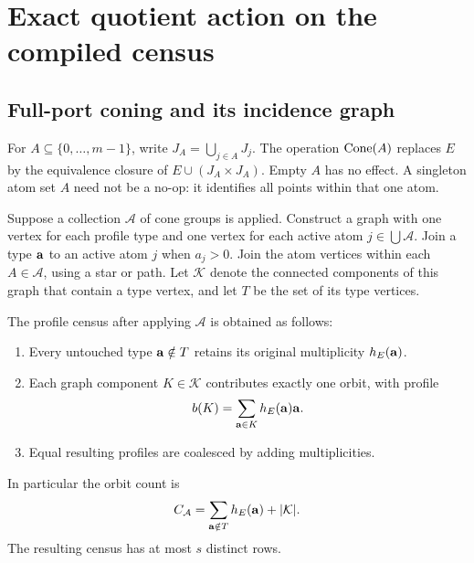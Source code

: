 \section{Exact quotient action on the compiled census}
\label{sec:quotients}

\subsection{Full-port coning and its incidence graph}

For $A\subseteq\{0,\ldots,m-1\}$, write $J_A=\bigcup_{j\in A}J_j$.
The operation $\operatorname{Cone}(A)$ replaces $E$ by the equivalence closure of
$E\cup(J_A\times J_A)$. Empty $A$ has no effect. A singleton atom set $A$
need not be a no-op: it identifies all points within that one atom.

Suppose a collection $\mathcal A$ of cone groups is applied. Construct a
graph with one vertex for each profile type and one vertex for each active
atom $j\in\bigcup\mathcal A$. Join a type $\mathbf a$ to an active atom $j$
when $a_j>0$. Join the atom vertices within each $A\in\mathcal A$, using a
star or path. Let $\mathcal K$ denote the connected components of this graph
that contain a type vertex, and let $T$ be the set of its type vertices.

\begin{theorem}
\label{thm:quotient}
The profile census after applying $\mathcal A$ is obtained as follows:
\begin{enumerate}[label=(\roman*)]
\item Every untouched type $\mathbf a\notin T$ retains its original
multiplicity $h_E(\mathbf a)$.
\item Each graph component $K\in\mathcal K$ contributes exactly one orbit,
with profile
\[
 b(K)=\sum_{\mathbf a\in K}h_E(\mathbf a)\mathbf a.
\]
\item Equal resulting profiles are coalesced by adding multiplicities.
\end{enumerate}
In particular the orbit count is
\begin{equation}
 C_{\mathcal A}=\sum_{\mathbf a\notin T}h_E(\mathbf a)+|\mathcal K|.
 \label{eq:quotient-count}
\end{equation}
The resulting census has at most $s$ distinct rows.
\end{theorem}

